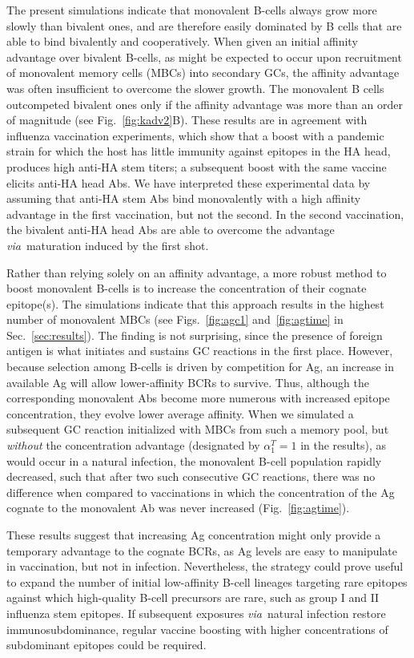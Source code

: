 \documentclass[utf8]{frontiersHLTH}%
\def\via {{\it via}}
\newcommand{\fig}[1]{Fig.~\ref{fig:#1}}
\newcommand{\figs}[2]{Figs.~\ref{fig:#1} and~\ref{fig:#2}}
\newcommand{\Sec}[1]{Sec.~\ref{sec:#1}}
\renewcommand{\sec}[1]{\Sec{#1}}
\begin{document}
The present simulations indicate that monovalent B-cells always
grow more slowly than bivalent ones, and are therefore easily dominated by B cells that are able to bind bivalently and
cooperatively. When given an initial affinity advantage over bivalent
B-cells, as might be expected to occur upon recruitment of monovalent memory
cells (MBCs) into secondary GCs, the affinity advantage was often
insufficient to overcome the slower growth.
The monovalent B cells outcompeted bivalent ones only if the
affinity advantage was more than an order of magnitude (see \fig{kadv2}B). These
results are in agreement with influenza vaccination experiments, which show
that a boost with a pandemic strain for which the host has little
immunity against epitopes in the HA head, produces high anti-HA stem
titers; a subsequent boost with the same vaccine elicits anti-HA head
Abs.\cite{ellebedy14} We have interpreted these experimental data by assuming 
that anti-HA stem Abs bind monovalently with
a high affinity advantage in the first vaccination, but not the second.
In the second vaccination, the bivalent anti-HA head 
Abs are able to overcome the advantage \via~maturation induced by the first shot.

Rather than relying solely on an affinity advantage, a more robust method
to boost monovalent B-cells is to increase the concentration of their cognate
epitope(s). The simulations indicate that this approach results in the highest
number of monovalent MBCs (see \figs{agc1}{agtime} in \sec{results}).
The finding is not surprising, since the presence of foreign
antigen is what initiates and sustains GC reactions in the first place.
However, because selection among B-cells is driven by competition for Ag, an
increase in available Ag will allow lower-affinity BCRs to survive.
Thus, although the corresponding monovalent Abs become more numerous with increased epitope concentration,
they evolve lower average affinity.
When we simulated a subsequent
GC reaction initialized with MBCs from such a memory pool, but
\textit{without} the concentration advantage (designated by $\alpha_1^T=1$ in
the results), as would occur in a
natural infection, the monovalent B-cell population rapidly decreased,
such that after two such consecutive GC reactions, there was no difference
when compared to vaccinations in which the concentration of the Ag
cognate to the monovalent Ab was never increased (\fig{agtime}).

These results suggest
that increasing Ag concentration might only provide a temporary advantage
to the cognate BCRs, as Ag levels are easy to manipulate in
vaccination, but not in infection. Nevertheless, the strategy could prove
useful to expand the number of initial low-affinity B-cell lineages
targeting rare epitopes against which high-quality B-cell precursors are
rare, such as group I and II influenza stem epitopes. If subsequent
exposures \via~natural infection restore immunosubdominance,\cite{ellebedy14} regular
vaccine boosting with higher concentrations of subdominant epitopes could be
required.
\end{document}
